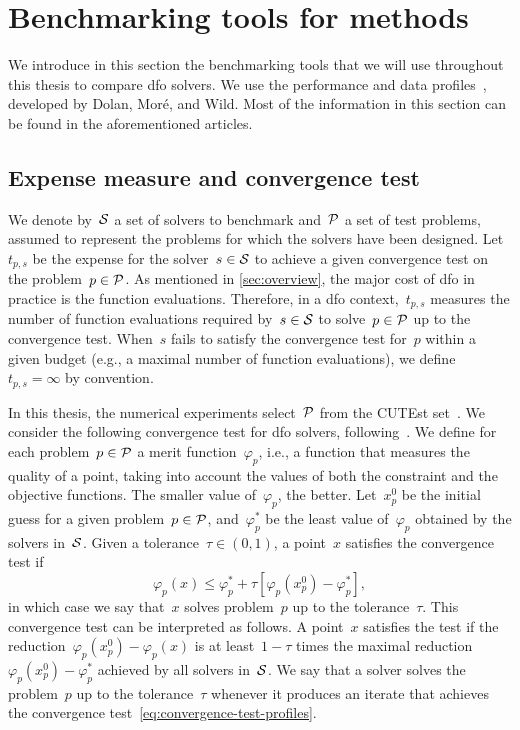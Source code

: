 \section{Benchmarking tools for  methods}
\label{sec:benchmarking-tools}

We introduce in this section the benchmarking tools that we will use throughout this thesis to compare \gls{dfo} solvers.
We use the performance and data profiles~\cite{Dolan_More_2002,More_Wild_2009}, developed by Dolan, Mor{\'{e}}, and Wild.
Most of the information in this section can be found in the aforementioned articles.

\subsection{Expense measure and convergence test}
\label{subsec:convergence-test}

We denote by~$\mathcal{S}$ a set of solvers to benchmark and~$\mathcal{P}$ a set of test problems, assumed to represent the problems for which the solvers have been designed.
Let~$t_{p, s}$ be the expense for the solver~$s \in \mathcal{S}$ to achieve a given convergence test on the problem~$p \in \mathcal{P}$.
As mentioned in \cref{sec:overview}, the major cost of \gls{dfo} in practice is the function evaluations.
Therefore, in a \gls{dfo} context,~$t_{p, s}$ measures the number of function evaluations required by~$s \in \mathcal{S}$ to solve~$p \in \mathcal{P}$ up to the convergence test.
When~$s$ fails to satisfy the convergence test for~$p$ within a given budget (e.g., a maximal number of function evaluations), we define~$t_{p, s} = \infty$ by convention.

In this thesis, the numerical experiments select~$\mathcal{P}$ from the CUTEst set~\cite{Gould_Orban_Toint_2015}.
We consider the following convergence test for \gls{dfo} solvers, following~\cite[\S~2]{More_Wild_2009}.
We define for each problem~$p \in \mathcal{P}$ a merit function~$\varphi_p$, i.e., a function that measures the quality of a point, taking into account the values of both the constraint and the objective functions.
The smaller value of~$\varphi_p$, the better.
Let~$x_p^0$ be the initial guess for a given problem~$p \in \mathcal{P}$, and~$\varphi_p^{\ast}$ be the least value of~$\varphi_p$ obtained by the solvers in~$\mathcal{S}$.
Given a tolerance~$\tau \in (0, 1)$, a point~$x$ satisfies the convergence test if
\begin{equation}
    \label{eq:convergence-test-profiles}
    \varphi_p(x) \le \varphi_p^{\ast} + \tau [\varphi_p(x_p^0) - \varphi_p^{\ast}],
\end{equation}
in which case we say that~$x$ solves problem~$p$ up to the tolerance~$\tau$.
This convergence test can be interpreted as follows.
A point~$x$ satisfies the test if the reduction~$\varphi_p(x_p^0) - \varphi_p(x)$ is at least~$1 - \tau$ times the maximal reduction~$\varphi_p(x_p^0) - \varphi_p^{\ast}$ achieved by all solvers in~$\mathcal{S}$.
We say that a solver solves the problem~$p$ up to the tolerance~$\tau$ whenever it produces an iterate that achieves the convergence test~\cref{eq:convergence-test-profiles}.

